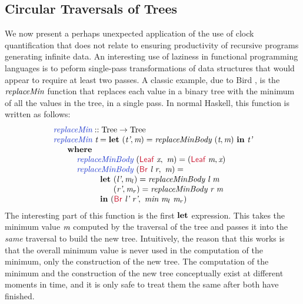 \subsection{Circular Traversals of Trees}

We now present a perhaps unexpected application of the use of clock
quantification that does not relate to ensuring productivity of
recursive programs generating infinite data. An interesting use of
laziness in functional programming languages is to peform single-pass
transformations of data structures that would appear to require at
least two passes. A classic example, due to Bird
\cite{bird84circular}, is the $\textit{replaceMin}$ function that
replaces each value in a binary tree with the minimum of all the
values in the tree, in a single pass. In normal Haskell, this function
is written as follows:
\begin{displaymath}
  \begin{array}{l}
    \defn{replaceMin} :: \tyname{Tree} \to \tyname{Tree} \\
    \defn{replaceMin}\ \ident{t} = \kw{let}\ (\ident{t'}, \ident{m}) = \ident{replaceMinBody}\ (\ident{t}, \ident{m})\ \kw{in}\ \ident{t'} \\
    \hspace{0.6cm} \kw{where} \\
    \hspace{1cm} \defn{replaceMinBody}\ (\cons{Leaf}\ \ident{x},\ \ident{m}) = (\cons{Leaf}\ \ident{m}, \ident{x}) \\
    \hspace{1cm} \defn{replaceMinBody}\ (\cons{Br}\ \ident{l}\ \ident{r},\ \ident{m}) = \\
    \hspace{2cm} \kw{let}\ (\ident{l'}, \ident{m$_l$}) = \ident{replaceMinBody}\ \ident{l}\ \ident{m} \\
    \hspace{2cm} \textcolor{white}{\kw{let}\ }(\ident{r'}, \ident{m$_r$}) = \ident{replaceMinBody}\ \ident{r}\ \ident{m} \\
    \hspace{2cm} \kw{in}\ (\cons{Br}\ \ident{l'}\ \ident{r'},\ \ident{min}\ \ident{m$_l$}\ \ident{m$_r$})
  \end{array}
\end{displaymath}
The interesting part of this function is the first $\textbf{let}$
expression. This takes the minimum value $\textit{m}$ computed by the
traversal of the tree and passes it into the \emph{same} traversal to
build the new tree. Intuitively, the reason that this works is that
the overall minimum value is never used in the computation of the
minimum, only the construction of the new tree. The computation of the
minimum and the construction of the new tree conceptually exist at
different moments in time, and it is only safe to treat them the same
after both have finished.

